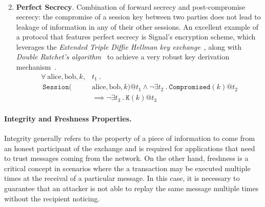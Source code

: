 \begin{enumerate}
\begin{align*}
        \end{align*}
    \item \textbf{Perfect Secrecy}. Combination of forward secrecy and post-compromise secrecy: the compromise of a session key between two parties does not lead to leakage of information in any of their other sessions. An excellent example of a protocol that features perfect secrecy is Signal's encryption scheme, which leverages the \textit{Extended Triple Diffie Hellman key exchange}~\cite{x3dh}, along with \textit{Double Ratchet's algorithm}~\cite{doubleratchet} to achieve a very robust key derivation mechanism~\cite{signal}.
        \begin{align*}
            \forall \ \text{alice}, \text{bob},k, &t_1 \ . \\ \
            \mathtt{Session}(&\text{alice},\text{bob},k) @ t_1 \land \neg \exists t_2 \ . \ \mathtt{Compromised}(k)@t_2 \\
            &\implies \neg \exists t_3 \ . \ \mathtt{K}(k) @ t_3
        \end{align*}
\end{enumerate}

\paragraph{\textbf{Integrity and Freshness Properties}.} Integrity generally refers to the property of a piece of information to come from an honest participant of the exchange and is required for applications that need to trust messages coming from the network. On the other hand, freshness is a critical concept in scenarios where the a transaction may be executed multiple times at the receival of a particular message. In this case, it is necessary to guarantee that an attacker is not able to replay the same message multiple times without the recipient noticing.

